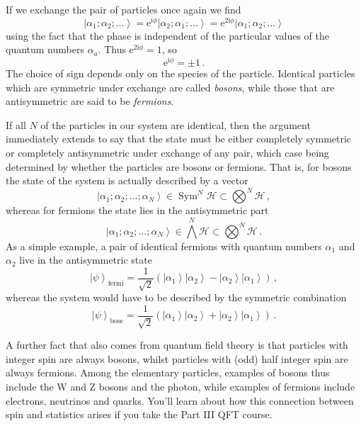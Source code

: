 \documentclass{article}
\theoremstyle{plain}\theoremheaderfont{\normalfont\itshape}\theorembodyfont{\rmfamily}\theoremseparator{.}\newtheorem*{rem}{Remark}\newtheorem*{ex}{Example}\newtheorem*{proof}{Proof}\newtheorem*{altp}{Alternative proof}
\theoremstyle{plain}\theoremheaderfont{\normalfont\bfseries}\theorembodyfont{\rmfamily}\theoremseparator{.}\newtheorem{thm}{Theorem}[section]\newtheorem{lem}[thm]{Lemma}\newtheorem{prop}[thm]{Proposition}\newtheorem*{cor}{Corollary}\newtheorem{defn}[thm]{Definition}\newtheorem{clm}[thm]{Claim}\newtheorem{clminproof}{Claim}
\theoremstyle{break}\theoremheaderfont{\normalfont\itshape}\theorembodyfont{\rmfamily}\theoremseparator{.\medskip}\newtheorem*{proofskip}{Proof}\newtheorem*{exs}{Examples}\newtheorem*{rems}{Remarks}
\theoremstyle{break}\theoremheaderfont{\normalfont\bfseries}\theorembodyfont{\rmfamily}\theoremseparator{.\medskip}\newtheorem{lemskip}[thm]{Lemma}\newtheorem{defnskip}[thm]{Definition}\newtheorem{propskip}[thm]{Proposition}\newtheorem{thmskip}[thm]{Theorem}
\numberwithin{equation}{section}
\newcommand{\ii}{\mathrm{i}}
\newcommand{\ee}{\mathrm{e}}
\newcommand{\ket}[1]{\left| #1 \right\rangle}
\newcommand{\hb}{\mathcal{H}}
\DeclareMathOperator{\Sym}{Sym}
\begin{document}
    If we exchange the pair of particles once again we find
    \begin{equation}
        \ket{\alpha_1;\alpha_2;\dots}=\ee^{\ii \phi}\ket{\alpha_2;\alpha_1;\dots}=\ee^{2\ii\phi}\ket{\alpha_1;\alpha_2;\dots}
    \end{equation}
    using the fact that the phase is independent of the particular values of the quantum numbers \(\alpha_a\). Thus \(\ee^{2\ii\phi}=1\), so
    \begin{equation}
        \ee^{\ii \phi}=\pm 1\,.
    \end{equation}
    The choice of sign depends only on the species of the particle. Identical particles which are symmetric under exchange are called \textit{bosons}, while those that are antisymmetric are said to be \textit{fermions}.

    If all \(N\) of the particles in our system are identical, then the argument immediately extends to say that the state must be either completely symmetric or completely antisymmetric under exchange of any pair, which case being determined by whether the particles are bosons or fermions. That is, for bosons the state of the system is actually described by a vector
    \begin{equation}
        \ket{\alpha_1;\alpha_2;\dots;\alpha_N}\in\Sym^N\hb\subset\bigotimes^N\hb\,,
    \end{equation}
    whereas for fermions the state lies in the antisymmetric part
    \begin{equation}
        \ket{\alpha_1;\alpha_2;\dots;\alpha_N}\in\bigwedge^N\hb\subset\bigotimes^N\hb\,.
    \end{equation}
    As a simple example, a pair of identical fermions with quantum numbers \(\alpha_1\) and \(\alpha_2\) live in the antisymmetric state
    \begin{equation}
        \ket{\psi}_{\text{fermi}}=\frac{1}{\sqrt{2}}\left(\ket{\alpha_1}\ket{\alpha_2}-\ket{\alpha_2}\ket{\alpha_1}\right)\,,
    \end{equation}
    whereas the system would have to be described by the symmetric combination
    \begin{equation}
        \ket{\psi}_{\text{bose}}=\frac{1}{\sqrt{2}}\left(\ket{\alpha_1}\ket{\alpha_2}+\ket{\alpha_2}\ket{\alpha_1}\right)\,.
    \end{equation}

    A further fact that also comes from quantum field theory is that particles with integer spin are always bosons, whilst particles with (odd) half integer spin are always fermions. Among the elementary particles, examples of bosons thus include the W and Z bosons and the photon, while examples of fermions include electrons, neutrinos and quarks. You'll learn about how this connection between spin and statistics arises if you take the Part III QFT course.
\end{document}

